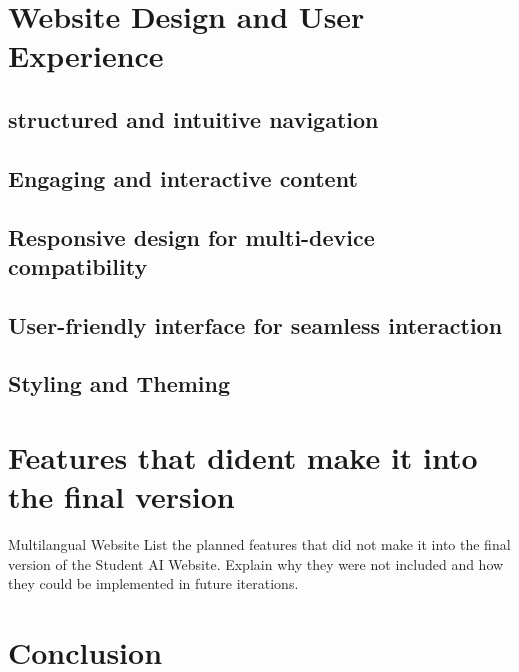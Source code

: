 
\section{Website Design and User Experience} 


\subsection{structured and intuitive navigation}

\subsection{Engaging and interactive content}

\subsection{Responsive design for multi-device compatibility}

\subsection{User-friendly interface for seamless interaction}

\subsection{Styling and Theming}

\section{Features that dident make it into the final version}

Multilangual Website 
List the planned features that did not make it into the final version of the Student AI Website.
Explain why they were not included and how they could be implemented in future iterations.

\section{Conclusion}





